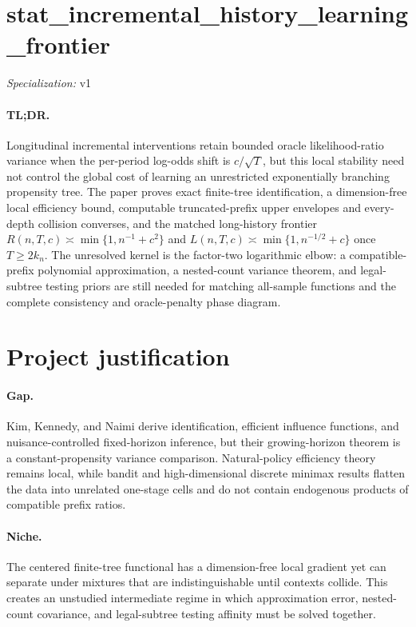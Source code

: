 \documentclass{article}
\begin{document}
\sloppy

\section*{stat\_\allowbreak{}incremental\_\allowbreak{}history\_\allowbreak{}learning\_\allowbreak{}frontier}

\noindent\textit{Specialization:} v1\par

\paragraph{TL;DR.} Longitudinal incremental interventions retain bounded oracle likelihood-ratio variance when the per-period log-odds shift is \(c/\sqrt T\), but this local stability need not control the global cost of learning an unrestricted exponentially branching propensity tree. The paper proves exact finite-tree identification, a dimension-free local efficiency bound, computable truncated-prefix upper envelopes and every-depth collision converses, and the matched long-history frontier \(R(n,T,c)\asymp\min\{1,n^{-1}+c^2\}\) and \(L(n,T,c)\asymp\min\{1,n^{-1/2}+c\}\) once \(T\geq2k_n\). The unresolved kernel is the factor-two logarithmic elbow: a compatible-prefix polynomial approximation, a nested-count variance theorem, and legal-subtree testing priors are still needed for matching all-sample functions and the complete consistency and oracle-penalty phase diagram.

\section{Project justification}

\paragraph{Gap.} Kim, Kennedy, and Naimi derive identification, efficient influence functions, and nuisance-controlled fixed-horizon inference, but their growing-horizon theorem is a constant-propensity variance comparison. Natural-policy efficiency theory remains local, while bandit and high-dimensional discrete minimax results flatten the data into unrelated one-stage cells and do not contain endogenous products of compatible prefix ratios.

\paragraph{Niche.} The centered finite-tree functional has a dimension-free local gradient yet can separate under mixtures that are indistinguishable until contexts collide. This creates an unstudied intermediate regime in which approximation error, nested-count covariance, and legal-subtree testing affinity must be solved together.
\end{document}
